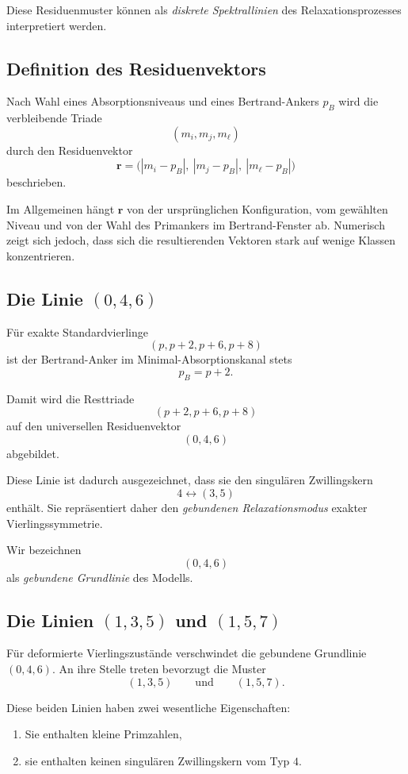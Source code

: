 \documentclass[11pt,a4paper]{article}
\theoremstyle{definition}
\theoremstyle{plain}
\theoremstyle{remark}
\begin{document}
	Diese Residuenmuster können als \emph{diskrete Spektrallinien} des Relaxationsprozesses interpretiert werden.
	
	\subsection{Definition des Residuenvektors}
	
	Nach Wahl eines Absorptionsniveaus und eines Bertrand-Ankers \(p_B\) wird die verbleibende Triade
	\[
	(m_i,m_j,m_\ell)
	\]
	durch den Residuenvektor
	\[
	\mathbf r
	=
	\bigl(
	|m_i-p_B|,
	\ |m_j-p_B|,
	\ |m_\ell-p_B|
	\bigr)
	\]
	beschrieben.
	
	Im Allgemeinen hängt \(\mathbf r\) von der ursprünglichen Konfiguration, vom gewählten Niveau und von der Wahl des Primankers im Bertrand-Fenster ab. 
	Numerisch zeigt sich jedoch, dass sich die resultierenden Vektoren stark auf wenige Klassen konzentrieren.
	
	\subsection{Die Linie \texorpdfstring{$(0,4,6)$}{(0,4,6)}}
	
	Für exakte Standardvierlinge
	\[
	(p,p+2,p+6,p+8)
	\]
	ist der Bertrand-Anker im Minimal-Absorptionskanal stets
	\[
	p_B=p+2.
	\]
	
	Damit wird die Resttriade
	\[
	(p+2,p+6,p+8)
	\]
	auf den universellen Residuenvektor
	\[
	(0,4,6)
	\]
	abgebildet.
	
	Diese Linie ist dadurch ausgezeichnet, dass sie den singulären Zwillingskern
	\[
	4 \leftrightarrow (3,5)
	\]
	enthält. 
	Sie repräsentiert daher den \emph{gebundenen Relaxationsmodus} exakter Vierlingssymmetrie.
	
	Wir bezeichnen
	\[
	(0,4,6)
	\]
	als \emph{gebundene Grundlinie} des Modells.
	
	\subsection{Die Linien \texorpdfstring{$(1,3,5)$}{(1,3,5)} und \texorpdfstring{$(1,5,7)$}{(1,5,7)}}
	
	Für deformierte Vierlingszustände verschwindet die gebundene Grundlinie \((0,4,6)\). 
	An ihre Stelle treten bevorzugt die Muster
	\[
	(1,3,5)
	\qquad\text{und}\qquad
	(1,5,7).
	\]
	
	Diese beiden Linien haben zwei wesentliche Eigenschaften:
	
	\begin{enumerate}
		\item Sie enthalten kleine Primzahlen,
		\item sie enthalten keinen singulären Zwillingskern vom Typ \(4\).
	\end{enumerate}
	
\end{document}
